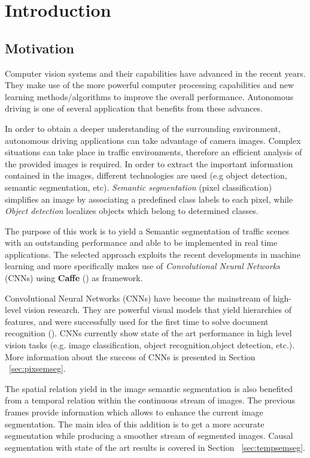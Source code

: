 \chapter{Introduction}
\label{ch:Introduction}

\section{Motivation}
\label{sec:Motivation}

Computer vision systems and their capabilities have advanced in the recent years. They make use of the more powerful computer processing capabilities and new learning methods/algorithms to improve the overall performance. Autonomous driving is one of several application that benefits from these advances.
 
In order to obtain a deeper understanding of the surrounding environment, autonomous driving applications can take advantage of camera images. Complex situations can take place in traffic environments, therefore an efficient analysis of the provided images is required. In order to extract the important information contained in the images, different technologies are used (e.g object detection, semantic segmentation, etc). \textit{Semantic segmentation} (pixel classification) simplifies an image by associating a predefined class labels to each pixel, while \textit{Object detection} localizes objects which belong to determined classes. 
 
The purpose of this work is to yield a Semantic segmentation of traffic scenes with an outstanding performance and able to be implemented in real time applications. The selected approach exploits the recent developments in machine learning and more specifically makes use of \textit{Convolutional Neural Networks} (CNNs) using \textbf{Caffe} (\textcite{jia2014caffe}) as framework.

Convolutional Neural Networks (CNNs) have become the mainstream of high-level vision research. They are powerful visual models that yield hierarchies of features, and were successfully used for the first time to solve document recognition (\textcite{lecun1998gradient}). CNNs currently show state of the art performance in high level vision tasks (e.g. image classification, object recognition,object detection, etc.). More information about the success of CNNs is presented in Section ~\ref{sec:pixsemseg}. 

The spatial relation yield in the image semantic segmentation is also benefited from a temporal relation within the continuous stream of images. The previous frames provide information which allows to enhance the current image segmentation. The main idea of this addition is to get a more accurate segmentation while producing a smoother stream of segmented images. Causal segmentation with state of the art results is covered in Section ~\ref{sec:tempsemseg}. 

